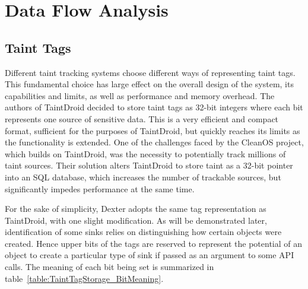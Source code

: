 \documentclass[12pt,twoside,notitlepage]{report}
\begin{document}
\section{Data Flow Analysis}

\subsection{Taint Tags}

Different taint tracking systems choose different ways of representing taint tags. This fundamental choice has large effect on the overall design of the system, its capabilities and limits, as well as performance and memory overhead. The authors of TaintDroid decided to store taint tags as 32-bit integers where each bit represents one source of sensitive data. This is a very efficient and compact format, sufficient for the purposes of TaintDroid, but quickly reaches its limits as the functionality is extended. One of the challenges faced by the CleanOS project, which builds on TaintDroid, was the necessity to potentially track millions of taint sources. Their solution alters TaintDroid to store taint as a 32-bit pointer into an SQL database, which increases the number of trackable sources, but significantly impedes performance at the same time. 

For the sake of simplicity, Dexter adopts the same tag representation as TaintDroid, with one slight modification. As will be demonstrated later, identification of some sinks relies on distinguishing how certain objects were created. Hence upper bits of the tags are reserved to represent the potential of an object to create a particular type of sink if passed as an argument to some API calls. The meaning of each bit being set is summarized in table~\ref{table:TaintTagStorage_BitMeaning}.
\end{document}

